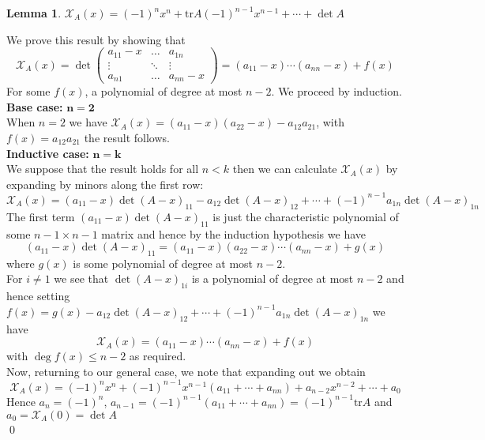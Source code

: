 \documentclass[11pt, a4paper]{report}
\makeatletter
\numberwithin{equation}{section}
\renewcommand{\chi}{\mathcal{X}}
\newcommand{\tr}{\text{tr}}
\numberwithin{equation}{subsection}
\theoremstyle{plain}
\theoremstyle{definition}
\newtheorem{lem}[thm]{Lemma}
\theoremstyle{remark}
\newtheorem*{prf}{Proof}
\renewenvironment{prf}[1][\proofname]{\par
  \vspace{-\topsep}%
  \normalfont
  \topsep0pt \partopsep0pt %
  \trivlist
  \item[\hskip\labelsep
        \itshape
    #1\@addpunct{.}]\ignorespaces
}{%
  \popQED\endtrivlist\@endpefalse
  \addvspace{6pt plus 6pt} %
}
\newcommand{\pr}[1]{\begin{adjustwidth}{1cm}{} \begin{prf} #1 \end{prf} \end{adjustwidth}}
\makeatother
\begin{document}
\begin{lem} $\chi_A(x) = (-1)^n x^n + \tr A (-1)^{n-1} x^{n-1} + \cdots + \det A$
\pr{
We prove this result by showing that
$$\chi_A(x) = \det \left( \begin{smallmatrix}
a_{11} - x & \hdots & a_{1n}\\
\scriptscriptstyle\vdots & \scriptscriptstyle\ddots & \scriptscriptstyle\vdots\\
a_{n1} & \hdots & a_{nn}-x
\end{smallmatrix} \right) = (a_{11} - x)\cdots(a_{nn} - x) + f(x)$$
For some $f(x)$, a polynomial of degree at most $n-2$. We proceed by induction.\\
\textbf{Base case: }$\boldsymbol{n=2}$\\
When $n = 2$ we have $\chi_A(x) = (a_{11} - x)(a_{22} - x) - a_{12}a_{21}$, with $f(x) = a_{12}a_{21}$ the result follows.\\
\textbf{Inductive case: }$\boldsymbol{n=k}$\\
We suppose that the result holds for all $n < k$ then we can calculate $\chi_A(x)$ by expanding by minors along the first row:
$$\chi_A(x) = (a_{11} - x) \det (A-x)_{11} - a_{12} \det (A-x)_{12} + \cdots + (-1)^{n-1} a_{1n} \det (A-x)_{1n}$$
The first term $(a_{11} - x) \det (A-x)_{11}$ is just the characteristic polynomial of some $n-1 \times n-1$ matrix and hence by the induction hypothesis we have $$(a_{11} - x) \det (A-x)_{11} = (a_{11} - x)(a_{22} - x)\cdots(a_{nn} - x) + g(x)$$
where $g(x)$ is some polynomial of degree at most $n-2$.\\
For $i \neq 1$ we see that $\det (A-x)_{1i}$ is a polynomial of degree at most $n-2$ and hence setting $f(x) = g(x) - a_{12} \det(A-x)_{12} + \cdots + (-1)^{n-1} a_{1n} \det(A-x)_{1n}$ we have
$$\chi_A(x) = (a_{11} - x)\cdots(a_{nn} - x) + f(x)$$
with $\deg f(x) \leq n-2$ as required.\\
Now, returning to our general case, we note that expanding out we obtain $$\chi_A(x) = (-1)^n x^n + (-1)^{n-1} x^{n-1} (a_{11} + \cdots + a_{nn}) + a_{n-2} x^{n-2} + \cdots + a_0$$
Hence $a_n = (-1)^n$, $a_{n-1} = (-1)^{n-1} (a_{11} + \cdots + a_{nn}) = (-1)^{n-1} \tr A$ and $a_0 = \chi_A(0) = \det A$ \\[-8pt]\qed
}
\end{lem}
\end{document}
